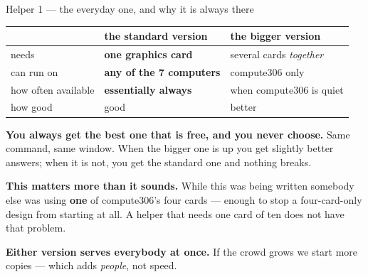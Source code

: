 \documentclass[aspectratio=169]{beamer}
\newcommand{\keybox}[1]{%
  \begin{center}
  \colorbox{black!8}{\parbox{0.92\textwidth}{\centering #1}}
  \end{center}}
\begin{document}
\begin{frame}{Helper 1 --- the everyday one, and why it is always there}

\begin{center}
\small
\renewcommand{\arraystretch}{1.25}
\begin{tabular}{@{}lll@{}}
\toprule
& \textbf{the standard version} & \textbf{the bigger version} \\
\midrule
needs & \textbf{one graphics card} & several cards \emph{together} \\
can run on & \textbf{any of the 7 computers} & compute306 only \\
how often available & \textbf{essentially always} & when compute306 is quiet \\
how good & good & better \\
\bottomrule
\end{tabular}
\end{center}

\vspace{0.5em}
\keybox{\small \textbf{You always get the best one that is free, and you never choose.} Same
command, same window. When the bigger one is up you get slightly better answers; when it is not, you
get the standard one and nothing breaks.}

\vspace{0.5em}
{\small \textbf{This matters more than it sounds.} While this was being written somebody else was
using \textbf{one} of compute306's four cards --- enough to stop a four-card-only design from
starting at all. A helper that needs one card of ten does not have that problem.}

\vspace{0.2em}
{\small \textbf{Either version serves everybody at once.} If the crowd grows we start more copies
--- which adds \emph{people}, not speed.}

\end{frame}
\end{document}
